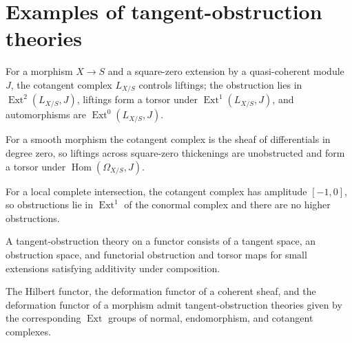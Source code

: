\section{Examples of tangent-obstruction theories}
\begin{definition}\label{fga-def-6-4-2}\uses{}
For a morphism $X\to S$ and a square-zero extension by a quasi-coherent module
$J$, the cotangent complex $L_{X/S}$ controls liftings; the obstruction lies in
$\operatorname{Ext}^2(L_{X/S},J)$, liftings form a torsor under
$\operatorname{Ext}^1(L_{X/S},J)$, and automorphisms are
$\operatorname{Ext}^0(L_{X/S},J)$.
\end{definition}\begin{theorem}\label{fga-thm-6-4-5}
For a smooth morphism the cotangent complex is the sheaf of differentials in
degree zero, so liftings across square-zero thickenings are unobstructed and
form a torsor under $\operatorname{Hom}(\Omega_{X/S},J)$.
\end{theorem}
\begin{proposition}\label{fga-prop-6-4-7}
For a local complete intersection, the cotangent complex has amplitude
$[-1,0]$, so obstructions lie in $\operatorname{Ext}^1$ of the conormal
complex and there are no higher obstructions.
\end{proposition}
\begin{definition}\label{fga-def-6-4-8}
A tangent-obstruction theory on a functor consists of a tangent space, an
obstruction space, and functorial obstruction and torsor maps for small
extensions satisfying additivity under composition.
\end{definition}
\begin{theorem}\label{fga-thm-6-4-9}
The Hilbert functor, the deformation functor of a coherent sheaf, and the
deformation functor of a morphism admit tangent-obstruction theories given by
the corresponding $\operatorname{Ext}$ groups of normal, endomorphism, and
cotangent complexes.
\end{theorem}
